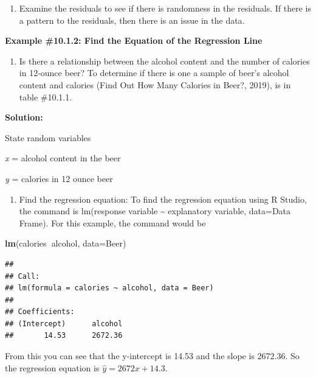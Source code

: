 \documentclass[]{book}
\newenvironment{Shaded}{\begin{snugshade}}{\end{snugshade}}
\newcommand{\DataTypeTok}[1]{\textcolor[rgb]{0.13,0.29,0.53}{#1}}
\newcommand{\KeywordTok}[1]{\textcolor[rgb]{0.13,0.29,0.53}{\textbf{#1}}}
\newcommand{\NormalTok}[1]{#1}
\newcommand{\OperatorTok}[1]{\textcolor[rgb]{0.81,0.36,0.00}{\textbf{#1}}}
\providecommand{\tightlist}{%
  \setlength{\itemsep}{0pt}\setlength{\parskip}{0pt}}
\begin{document}
\begin{enumerate}
\def\labelenumi{\roman{enumi}.}
\setcounter{enumi}{1}
\tightlist
\item
  Examine the residuals to see if there is randomness in the residuals. If there is a pattern to the residuals, then there is an issue in the data.
\end{enumerate}

\textbf{Example \#10.1.2: Find the Equation of the Regression Line}

\begin{enumerate}
\def\labelenumi{\alph{enumi}.}
\tightlist
\item
  Is there a relationship between the alcohol content and the number of calories in 12-ounce beer? To determine if there is one a sample of beer's alcohol content and calories (Find Out How Many Calories in Beer?, 2019), is in table \#10.1.1.
\end{enumerate}

\textbf{Solution:}

State random variables

\emph{x} = alcohol content in the beer

\emph{y} = calories in 12 ounce beer

\begin{enumerate}
\def\labelenumi{\alph{enumi}.}
\setcounter{enumi}{1}
\tightlist
\item
  Find the regression equation: To find the regression equation using R Studio, the command is lm(response variable \textasciitilde{} explanatory variable, data=Data Frame). For this example, the command would be
\end{enumerate}

\begin{Shaded}
\begin{Highlighting}[]
\KeywordTok{lm}\NormalTok{(calories}\OperatorTok{~}\NormalTok{alcohol, }\DataTypeTok{data=}\NormalTok{Beer)}
\end{Highlighting}
\end{Shaded}

\begin{verbatim}
## 
## Call:
## lm(formula = calories ~ alcohol, data = Beer)
## 
## Coefficients:
## (Intercept)      alcohol  
##       14.53      2672.36
\end{verbatim}

From this you can see that the y-intercept is 14.53 and the slope is 2672.36. So the regression equation is \(\hat{y}=2672x+14.3\).
\end{document}
